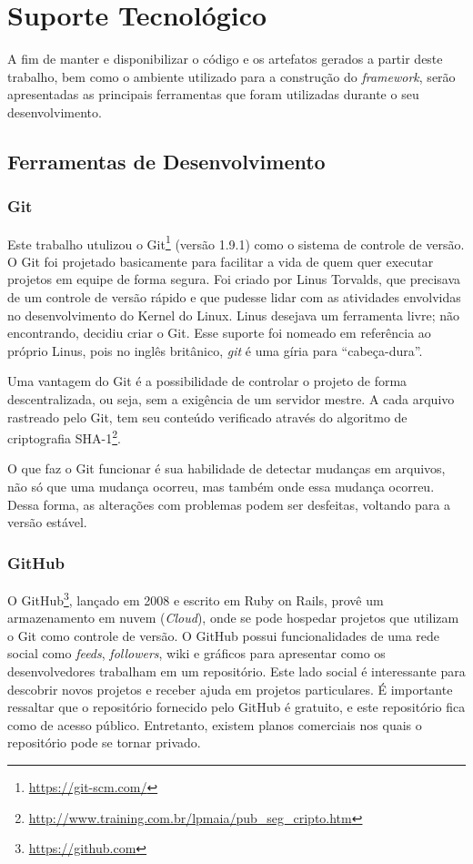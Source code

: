 \chapter{Suporte Tecnológico}
\label{chapter:Suporte_Tecnologico}

A fim de manter e disponibilizar o código e os artefatos gerados a partir deste trabalho, bem como o ambiente utilizado para a construção do \textit{framework}, serão apresentadas as principais ferramentas que foram utilizadas durante o seu desenvolvimento.

\section{Ferramentas de Desenvolvimento}

\subsection{Git}

Este trabalho utulizou o Git\footnote{\url{https://git-scm.com/}} (versão 1.9.1) como o sistema de controle de versão. O Git foi projetado basicamente para facilitar a vida de quem quer executar projetos em equipe de forma segura. Foi criado por Linus Torvalds, que precisava de um controle de versão rápido e que pudesse lidar com as atividades envolvidas no desenvolvimento do Kernel do Linux. Linus desejava um ferramenta livre; não encontrando, decidiu criar o Git. Esse suporte foi nomeado em referência ao próprio Linus, pois no inglês britânico, \textit{git} é uma gíria para ``cabeça-dura''.

Uma vantagem do Git é a possibilidade de controlar o projeto de forma descentralizada, ou seja, sem a exigência de um servidor mestre. A cada arquivo rastreado pelo Git, tem seu conteúdo verificado através do algoritmo de criptografia SHA-1\footnote{\url{http://www.training.com.br/lpmaia/pub_seg_cripto.htm}}.

O que faz o Git funcionar é sua habilidade de detectar mudanças em arquivos, não só que uma mudança ocorreu, mas também onde essa mudança ocorreu. Dessa forma, as alterações com problemas podem ser desfeitas, voltando para a versão estável.

\subsection{GitHub}

O GitHub\footnote{\url{https://github.com}}, lançado em 2008 e escrito em Ruby on Rails, provê um armazenamento em nuvem (\textit{Cloud}), onde se pode hospedar projetos que utilizam o Git como controle de versão. O GitHub possui funcionalidades de uma rede social como \textit{feeds}, \textit{followers}, wiki e gráficos para apresentar como os desenvolvedores trabalham em um repositório. Este lado social é interessante para descobrir novos projetos e receber ajuda em projetos particulares. É importante ressaltar que o repositório fornecido pelo GitHub é gratuito, e este repositório fica como de acesso público. Entretanto, existem planos comerciais nos quais o repositório pode se tornar privado.

